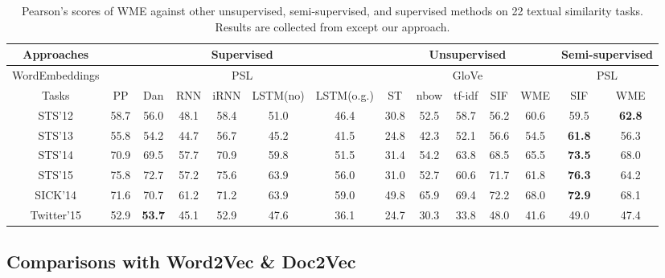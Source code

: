 \documentclass[11pt,a4paper]{article}
\newcommand{\1}{\boldsymbol{1}}
\begin{document}
\begin{table}[ht]
\centering
\scriptsize
\caption{Pearson's scores of WME against other unsupervised, semi-supervised, and supervised methods on 22 textual similarity tasks. Results are collected from \cite{arora2017simple} except our approach.}
\vspace{0mm}
\label{tb:comp_textual_similarity}
\newcommand{\Bd}[1]{\textbf{#1}}
\begin{center}
    \begin{tabular}{ c | cccccc | ccccc | cc}
    \hline
    \multicolumn{1}{c}{Approaches}  
    & \multicolumn{6}{c}{Supervised} 
    & \multicolumn{5}{c}{Unsupervised}
    & \multicolumn{2}{c}{Semi-supervised}\\ \hline 
    \multicolumn{1}{c}{WordEmbeddings}  
    & \multicolumn{6}{c}{PSL} 
    & \multicolumn{5}{c}{GloVe}
    & \multicolumn{2}{c}{PSL}\\ \hline 
    Tasks & PP & Dan & RNN & iRNN & LSTM(no) & LSTM(o.g.) & ST & nbow & tf-idf & SIF & WME & SIF & WME \\ \hline 
    STS'12 & 58.7 & 56.0 & 48.1 & 58.4 & 51.0 & 46.4 & 30.8 & 52.5 & 58.7 & 56.2 & 60.6 & 59.5 & \Bd{62.8}\\ 
    STS'13 & 55.8 & 54.2 & 44.7 & 56.7 & 45.2 & 41.5 & 24.8 & 42.3 & 52.1 & 56.6 & 54.5 & \Bd{61.8} & 56.3 \\ 
    STS'14 & 70.9 & 69.5 & 57.7 & 70.9 & 59.8 & 51.5 & 31.4 & 54.2 & 63.8 & 68.5 & 65.5 & \Bd{73.5} & 68.0 \\ 
    STS'15 & 75.8 & 72.7 & 57.2 & 75.6 & 63.9 & 56.0 & 31.0 & 52.7 & 60.6 & 71.7 & 61.8 & \Bd{76.3} & 64.2 \\
    SICK'14 & 71.6 & 70.7 & 61.2 & 71.2 & 63.9 & 59.0 & 49.8 & 65.9 & 69.4 & 72.2 & 68.0 & \Bd{72.9} & 68.1 \\
    Twitter'15 & 52.9 & \Bd{53.7} & 45.1 & 52.9 & 47.6 & 36.1 & 24.7 & 30.3 & 33.8 & 48.0 & 41.6 & 49.0 & 47.4 \\ \hline
    \end{tabular}
\end{center}
\vspace{0mm}
\end{table}

\subsection{Comparisons with Word2Vec \& Doc2Vec}
\label{sec:Comparisons against Word2Vec and Doc2Vec-based document representations}
\end{document}
